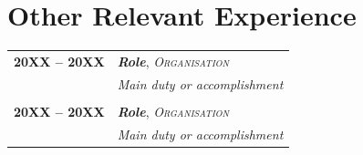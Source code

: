 \section{Other Relevant Experience}
\begin{longtable}{@{}p{2.5cm}>{\raggedright\arraybackslash}p{16cm}@{}}
\textbf{20XX -- 20XX} & \textbf{\textit{Role}}, \textsc{\textit{Organisation}} \\
& \textit{Main duty or accomplishment} \\
& \\
\textbf{20XX -- 20XX} & \textbf{\textit{Role}}, \textsc{\textit{Organisation}} \\
& \textit{Main duty or accomplishment} \\
\end{longtable}
